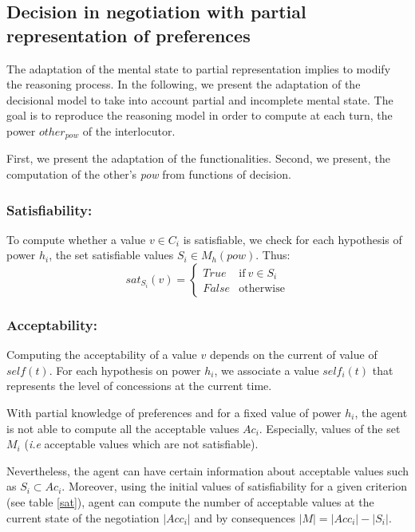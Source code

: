 \documentclass[sigconf]{aamas}  %
\begin{document}
	\subsection{Decision in negotiation with partial representation of preferences}
	The adaptation of the mental state to partial representation implies to modify the reasoning process. In the following, we present the adaptation of the decisional model to take into account partial and incomplete mental state. The goal is to reproduce the reasoning model in order to compute at each turn, the power $other_{pow}$ of the interlocutor. 
	
	First, we present the adaptation of the functionalities. Second, we present, the computation of the other's \emph{pow} from functions of decision.   
	
	\subsubsection{Satisfiability:}
	To compute whether a value $v \in C_i$ is satisfiable, we check for each hypothesis of power $h_i$, the set satisfiable values $S_i \in M_h(pow)$.
	Thus: 
	\begin{equation}
	sat_{S_i}(v)= \left\{\begin{array}{ll}
	True	 & \mathrm{if\ }  v \in S_i\\
	False & \mathrm{otherwise}
	\end{array}\right.
	\end{equation}
	
	\subsubsection{Acceptability:}
	Computing the acceptability of a value $v$ depends on the current of value of $self(t)$. For each hypothesis on power $h_i$, we associate a value $self_i(t)$ that represents the level of concessions at the current time. 
	
	With partial knowledge of preferences and for a fixed value of power $h_i$, the agent is not able to compute all the acceptable values $Ac_i$. Especially,   values of the set $M_i$ (\emph{i.e} acceptable values which are not satisfiable). 
	
	Nevertheless, the agent can have certain information about acceptable values such as $ S_i \subset Ac_i$. Moreover, using the initial values of satisfiability for a given criterion (see table \ref{sat}), agent can compute the number of acceptable values at the current state of the negotiation $|Acc_i|$ and by consequences $|M| = |Acc_i| - |S_i|$. 
	
\end{document}

